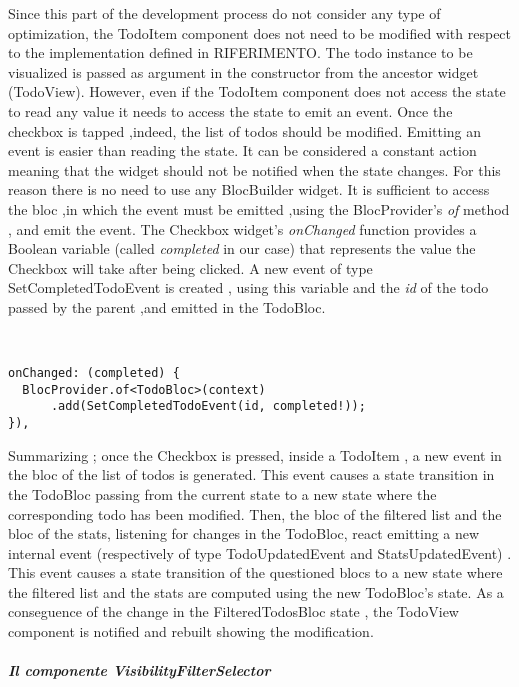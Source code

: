 Since this part of the development process do not consider any type of optimization, the TodoItem component does not need to be modified with respect to the implementation defined in RIFERIMENTO. The todo instance to be visualized is passed as argument in the constructor from the ancestor widget (TodoView). However, even if the TodoItem component does not access the state to read any value it needs to access the state to emit an event. Once the checkbox is tapped ,indeed, the list of todos should be modified. Emitting an event is easier than reading the state. It can be considered a constant action meaning that the widget should not be notified when the state changes. For this reason there is no need to use any BlocBuilder widget. It is sufficient to access the bloc ,in which the event must be emitted ,using the BlocProvider’s \textit{of} method , and emit the event. The Checkbox widget’s \textit{onChanged} function provides a Boolean variable (called \textit{completed} in our case) that represents the value the Checkbox will take after being clicked.  A new event of type SetCompletedTodoEvent is created , using this variable and the \textit{id} of the todo passed by the parent ,and emitted in the TodoBloc.
\begin{code}
\mbox{}\\
 \mbox{}
\label{code:2.14}
\begin{verbatim}
onChanged: (completed) {
  BlocProvider.of<TodoBloc>(context)
      .add(SetCompletedTodoEvent(id, completed!));
}),
\end{verbatim}
\mbox{}
\end{code}

Summarizing ;  once the Checkbox is pressed, inside a TodoItem , a new event in the bloc of the list of todos is generated. This event causes a state transition in the TodoBloc passing from the current state to a new state where the corresponding todo has been modified. Then, the bloc of the filtered list and the bloc of the stats, listening for changes in the TodoBloc, react emitting a new internal event (respectively of type TodoUpdatedEvent and StatsUpdatedEvent) . This event causes a state transition of the questioned blocs to a new state where the filtered list and the stats are computed using the new TodoBloc’s state. As a conseguence of the change in the FilteredTodosBloc state , the TodoView component is notified and rebuilt showing the modification.
\subparagraph{Il componente VisibilityFilterSelector}\mbox{}\\
\label{subpar:todo_app_bloc_core_state}

